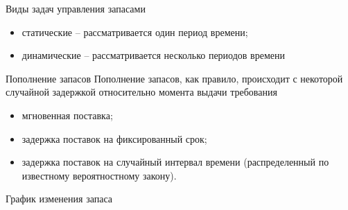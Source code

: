 \documentclass[unicode,11pt,notheorems,xcolor=table]{beamer}
\begin{document}

\begin{frame}{Виды задач управления запасами}
\begin{itemize}
    \item статические – рассматривается один период времени;
    \item динамические – рассматривается несколько периодов
    времени
\end{itemize}
\end{frame}


\begin{frame}{Пополнение запасов}
    Пополнение запасов, как правило, происходит с некоторой случайной задержкой относительно момента выдачи требования
\begin{itemize}
    \item мгновенная поставка;
    \item задержка поставок на фиксированный срок;
    \item задержка поставок на случайный интервал времени (распределенный по известному вероятностному закону).
\end{itemize}
\end{frame}


\begin{frame}{График изменения запаса}
    
\end{frame}
\end{document}
